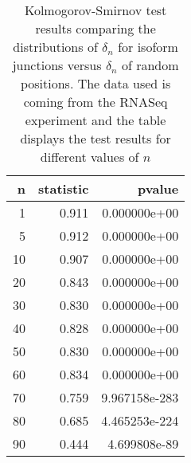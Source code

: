 \begin{table}[!h]
\centering

\begin{tabular}{|r|r|r|}
\toprule
  n &  statistic &         pvalue \\
\midrule
\hline
  1 &      0.911 &   0.000000e+00 \\
  \hline
  5 &      0.912 &   0.000000e+00 \\
  \hline
 10 &      0.907 &   0.000000e+00 \\
 \hline
 20 &      0.843 &   0.000000e+00 \\
 \hline
 30 &      0.830 &   0.000000e+00 \\
 \hline
 40 &      0.828 &   0.000000e+00 \\
 \hline
 50 &      0.830 &   0.000000e+00 \\
 \hline
 60 &      0.834 &   0.000000e+00 \\
 \hline
 70 &      0.759 &  9.967158e-283 \\
 \hline
 80 &      0.685 &  4.465253e-224 \\
 \hline
 90 &      0.444 &   4.699808e-89 \\
\bottomrule
\end{tabular}

\caption{ Kolmogorov-Smirnov test results comparing the distributions of $\delta_n$ for isoform junctions versus $\delta_n$ of random positions. The data used is coming from the RNASeq experiment and the table displays the test results for different values of $n$}
\label{test_results_rna}
\end{table}
